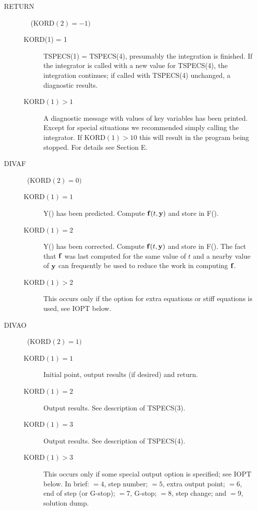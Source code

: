 \documentclass[twoside]{MATH77}
\begin{document}
\begin{description}
\item[RETURN]  \ \ (KORD$(2)=-1)$

\begin{description}
\item[KORD(1) = 1]  TSPECS(1) = TSPECS(4), presumably the integration
is finished. If the integrator is called with a new value for TSPECS(4), the
integration continues; if called with TSPECS(4) unchanged, a diagnostic
results.

\item[KORD$(1) > 1$]  A diagnostic message with values of key variables has
been printed. Except for special situations we recommended simply calling
the integrator. If KORD$(1)>10$ this will result in the program being
stopped. For details see Section E.
\end{description}

\item[DIVAF]  \ (KORD$(2)=0)$

\begin{description}
\item[KORD$(1) = 1$]  Y() has been predicted. Compute ${\bf f}(t,{\bf y})$
and store in F().

\item[KORD$(1) = 2$]  Y() has been corrected. Compute ${\bf f}(t,{\bf y})$
and store in F(). The fact that ${\bf f}$ was last computed for the same
value of $t$ and a nearby value of ${\bf y}$ can frequently be used to
reduce the work in computing ${\bf f}.$

\item[KORD$(1) > 2$]  This occurs only if the option for extra equations or
stiff equations is used, see IOPT below.
\end{description}

\item[DIVAO]  \ (KORD$(2)=1)$

\begin{description}
\item[KORD$(1) = 1$]  Initial point, output results (if desired) and return.

\item[KORD$(1) = 2$]  Output results.  See description of TSPECS(3).

\item[KORD$(1) = 3$]  Output results.  See description of TSPECS(4).

\item[KORD$(1) > 3$]  This occurs only if some special output option is
specified; see IOPT below.  In brief: $=4$, step number; $=5$, extra output
point; $=6$, end of step (or G-stop); $=7$, G-stop; $=8$, step change; and $%
=9$, solution dump.
\end{description}
\end{description}
\end{document}
